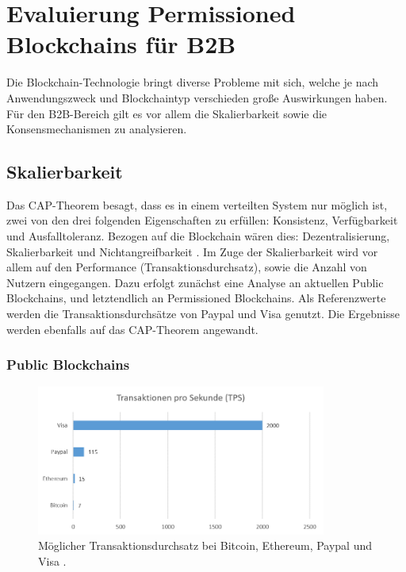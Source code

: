 \chapter{Evaluierung Permissioned Blockchains für B2B}
\label{cha:b2b-eval}

Die Blockchain-Technologie bringt diverse Probleme mit sich, welche je nach Anwendungszweck und Blockchaintyp verschieden große Auswirkungen haben. Für den B2B-Bereich gilt es vor allem die Skalierbarkeit sowie die Konsensmechanismen zu analysieren.

\section{Skalierbarkeit}
\label{sec:scalability-eval}
Das CAP-Theorem besagt, dass es in einem verteilten System nur möglich ist, zwei von den drei folgenden Eigenschaften zu erfüllen: Konsistenz, Verfügbarkeit und Ausfalltoleranz. Bezogen auf die Blockchain wären dies: Dezentralisierung, Skalierbarkeit und Nichtangreifbarkeit \cite{SchererPerformanceScalabilityBlockchain2017}. Im Zuge der Skalierbarkeit wird vor allem auf den Performance (Transaktionsdurchsatz), sowie die Anzahl von Nutzern  eingegangen. Dazu erfolgt zunächst eine Analyse an aktuellen Public Blockchains, und letztendlich an Permissioned Blockchains. Als Referenzwerte werden die Transaktionsdurchsätze von Paypal und Visa genutzt. Die Ergebnisse werden ebenfalls auf das CAP-Theorem angewandt.  

\subsection{Public Blockchains}
\begin{figure}[!htbp]
  \centering
    \includegraphics[width=0.85\textwidth,angle=0]{images/tps-comparison}
     \caption{Möglicher Transaktionsdurchsatz bei Bitcoin, Ethereum, Paypal und Visa \cite{BitcoinTeamScalabilityBitcoinWiki}.}
    \label{fig:tps-comparison}
\end{figure}


